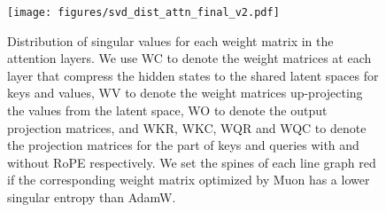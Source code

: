 \begin{figure}[t]
    \centering
    \texttt{[image: figures/svd\_dist\_attn\_final\_v2.pdf]}
    \caption{Distribution of singular values for each weight matrix in the attention layers. We use WC to denote the weight matrices at each layer that compress the hidden states to the shared latent spaces for keys and values, WV to denote the weight matrices up-projecting the values from the latent space, WO to denote the output projection matrices, and WKR, WKC, WQR and WQC to denote the projection matrices for the part of keys and queries with and without RoPE respectively. We set the spines of each line graph red if the corresponding weight matrix optimized by Muon has a lower singular entropy than AdamW.} 
    \label{fig_svd_attn} 
\end{figure}